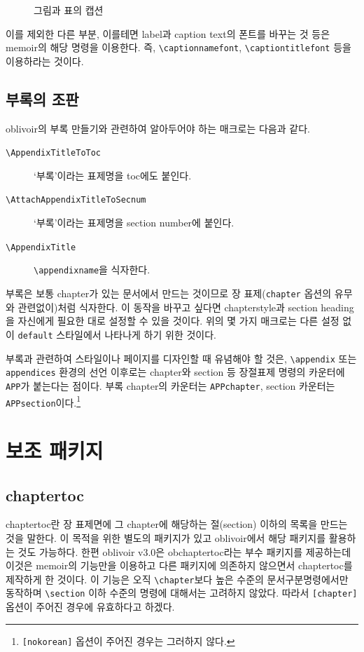 \documentclass[
	12pt,
	a4paper,
	kosection,
	footnote,
	microtype,
	figtabcapt,
]{oblivoir}
\def\cs#1{\texttt{\textbackslash #1}}
\begin{document}
\begin{figure}[h]
\caption{그림과 표의 캡션}
\end{figure}

이를 제외한 다른 부분, 이를테면 label과 caption text의 폰트를 바꾸는 것 등은 memoir의
해당 명령을 이용한다. 즉, \verb|\captionnamefont|, \verb|\captiontitlefont| 등을 이용하라는 것이다.

\subsection{부록의 조판}

\textsf{oblivoir}의 부록 만들기와 관련하여 알아두어야 하는 매크로는 다음과 같다.
\begin{description}
\item [\cs{AppendixTitleToToc}] `부록'이라는 표제명을 toc에도 붙인다.
\item [\cs{AttachAppendixTitleToSecnum}] `부록'이라는 표제명을 section number에 붙인다.
\item [\cs{AppendixTitle}] \cs{appendixname}을 식자한다.
\end{description}

부록은 보통 chapter가 있는 문서에서 만드는 것이므로 장 표제(\texttt{chapter} 옵션의 유무와 관련없이)처럼 식자한다.
이 동작을 바꾸고 싶다면 chapterstyle과 section heading을 자신에게
필요한 대로 설정할 수 있을 것이다. 위의 몇 가지 매크로는 다른 설정 없이
\texttt{default} 스타일에서 나타나게 하기 위한 것이다.

부록과 관련하여 스타일이나 페이지를 디자인할 때 유념해야 할 것은, \cs{appendix} 또는 \texttt{appendices} 환경의 선언 이후로는
chapter와 section 등 장절표제 명령의 카운터에 \verb|APP|가 붙는다는 점이다. 부록 chapter의 카운터는 \texttt{APPchapter}, section 카운터는 \texttt{APPsection}이다.\footnote{\texttt{[nokorean]} 옵션이 주어진 경우는 그러하지 않다.}

\section{보조 패키지}

\subsection{chaptertoc}

chaptertoc란 장 표제면에 그 chapter에 해당하는 절(section) 이하의 목록을
만드는 것을 말한다. 이 목적을 위한 별도의 패키지가 있고 oblivoir에서 해당 패키지를
활용하는 것도 가능하다. 한편 oblivoir v3.0은 \textsf{obchaptertoc}라는 부수
패키지를 제공하는데 이것은 \textsf{memoir}의 기능만을 이용하고 다른 패키지에
의존하지 않으면서 chaptertoc를 제작하게 한 것이다.
이 기능은 오직 \verb|\chapter|보다 높은 수준의 문서구분명령에서만 동작하며
\verb|\section| 이하 수준의 명령에 대해서는 고려하지 않았다. 따라서 \verb|[chapter]| 옵션이
주어진 경우에 유효하다고 하겠다.
\end{document}

